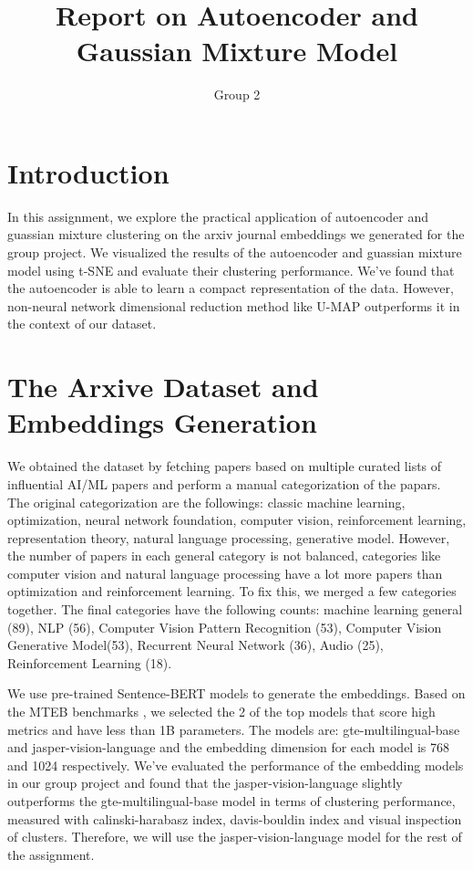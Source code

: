 \documentclass{article}
\title{Report on Autoencoder and Gaussian Mixture Model}
\author{Group 2}
\begin{document}
\pagestyle{fancy}
\fancyhf{}%
\fancyfoot[C]{\thepage}%
\maketitle


\section*{Introduction}
In this assignment, we explore the practical application of autoencoder and guassian mixture clustering on the arxiv journal embeddings we generated for the group project. We visualized the results of the autoencoder and guassian mixture model using t-SNE and evaluate their clustering performance. We've found that the autoencoder is able to learn a compact representation of the data. However, non-neural network dimensional reduction method like U-MAP outperforms it in the context of our dataset.

\section*{The Arxive Dataset and Embeddings Generation}
We obtained the dataset by fetching papers based on multiple curated lists of influential AI/ML papers and perform a manual categorization of the papars. The original categorization are the followings: classic machine learning, optimization, neural network foundation, computer vision, reinforcement learning, representation theory, natural language processing, generative model.   However, the number of papers in each general category is not balanced, categories like computer vision and natural language processing have a lot more papers than optimization and reinforcement learning. To fix this, we merged a few categories together. The final categories have the following counts: machine learning general (89), NLP (56), Computer Vision Pattern Recognition (53), Computer Vision Generative Model(53), Recurrent Neural Network (36), Audio (25), Reinforcement Learning (18).

We use pre-trained Sentence-BERT models to generate the embeddings. Based on the MTEB benchmarks \cite{enevoldsen2025mmtebmassivemultilingualtext}, we selected the 2 of the top models that score high metrics and have less than 1B parameters. The models are: gte-multilingual-base\cite{zhang2024mgte} and jasper-vision-language \cite{zhang2025jasperstelladistillationsota} and the embedding dimension for each model is 768 and 1024 respectively. We've evaluated the performance of the embedding models in our group project and found that the jasper-vision-language slightly outperforms the gte-multilingual-base model in terms of clustering performance, measured with calinski-harabasz index, davis-bouldin index and visual inspection of clusters. Therefore, we will use the jasper-vision-language model for the rest of the assignment.
\end{document}
